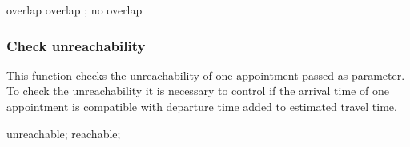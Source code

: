 \begin{algorithmic}
	
			\State \Return overlap
			\State \Return overlap
		\EndIf;
		\State \Return no overlap
	\EndFunction
\end{algorithmic}

\subsubsection{Check unreachability}
\label{subsec:algUnreachable}
This function checks the unreachability of one appointment passed as parameter.
To check the unreachability it is necessary to control if the arrival time of one appointment is compatible with departure time added to estimated travel time.

\begin{algorithmic}
	
			\State \Return unreachable;
		\Else 
			\State \Return reachable;
		\EndIf
	\EndFunction
\end{algorithmic}

